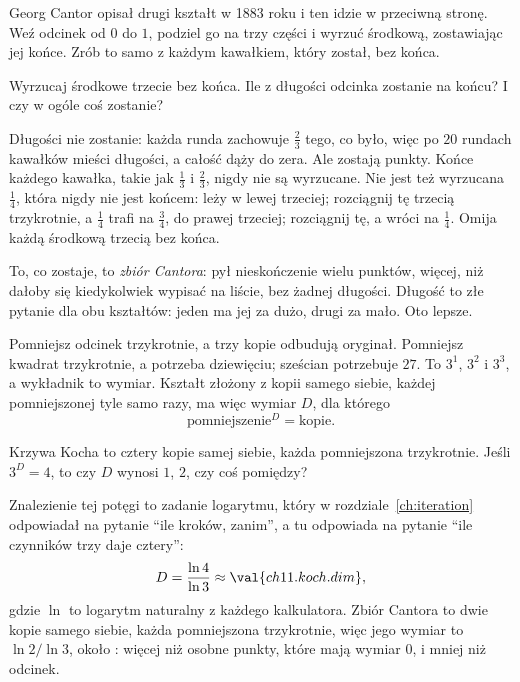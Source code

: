 \noindent
Georg Cantor opisał drugi kształt w 1883 roku i ten idzie w przeciwną
stronę. Weź odcinek od $0$ do $1$, podziel go na trzy części i wyrzuć
środkową, zostawiając jej końce. Zrób to samo z każdym kawałkiem, który
został, bez końca.

\begin{think}
Wyrzucaj środkowe trzecie bez końca. Ile z długości odcinka zostanie na
końcu? I czy w ogóle coś zostanie?
\end{think}
\begin{revealblock}
Długości nie zostanie: każda runda zachowuje $\tfrac{2}{3}$ tego, co było,
więc po $20$ rundach  kawałków mieści
 długości, a całość dąży do zera. Ale zostają punkty.
Końce każdego kawałka, takie jak $\tfrac{1}{3}$ i $\tfrac{2}{3}$, nigdy nie
są wyrzucane. Nie jest też wyrzucana $\tfrac{1}{4}$, która nigdy nie jest
końcem: leży w lewej trzeciej; rozciągnij tę trzecią trzykrotnie, a
$\tfrac{1}{4}$ trafi na $\tfrac{3}{4}$, do prawej trzeciej; rozciągnij tę, a
wróci na $\tfrac{1}{4}$. Omija każdą środkową trzecią bez końca.
\end{revealblock}%
To, co zostaje, to \emph{zbiór Cantora}: pył nieskończenie wielu punktów,
więcej, niż dałoby się kiedykolwiek wypisać na liście, bez żadnej długości.
Długość to złe pytanie dla obu kształtów: jeden ma jej za dużo, drugi za
mało. Oto lepsze.

Pomniejsz odcinek trzykrotnie, a trzy kopie odbudują oryginał. Pomniejsz
kwadrat trzykrotnie, a potrzeba dziewięciu; sześcian potrzebuje $27$. To
$3^{1}$, $3^{2}$ i $3^{3}$, a wykładnik to wymiar. Kształt złożony z kopii
samego siebie, każdej pomniejszonej tyle samo razy, ma więc wymiar $D$, dla
którego
\[ \text{pomniejszenie}^{D} = \text{kopie}. \]

\begin{think}
Krzywa Kocha to cztery kopie samej siebie, każda pomniejszona trzykrotnie.
Jeśli $3^{D} = 4$, to czy $D$ wynosi $1$, $2$, czy coś pomiędzy?
\end{think}
Znalezienie tej potęgi to zadanie logarytmu, który w
rozdziale~\ref{ch:iteration} odpowiadał na pytanie \enquote{ile kroków,
zanim}, a tu odpowiada na pytanie \enquote{ile czynników trzy daje cztery}:
\[ D = \frac{\ln 4}{\ln 3} \approx \val{ch11.koch.dim}, \]
gdzie $\ln$ to logarytm naturalny z każdego kalkulatora. Zbiór Cantora to
dwie kopie samego siebie, każda pomniejszona trzykrotnie, więc jego wymiar
to $\ln 2 / \ln 3$, około : więcej niż osobne punkty,
które mają wymiar $0$, i mniej niż odcinek.

